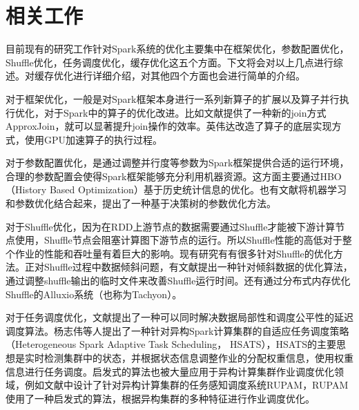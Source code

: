 \section{相关工作}
目前现有的研究工作针对Spark系统的优化主要集中在框架优化\cite{罗妮0基于机器学习的内存计算优化关键技术研究}\cite{廖湖声0Spark}，参数配置优化\cite{范天文2020基于内存计算框架}，Shuffle优化\cite{cheng2020ops}\cite{choi2015early}\cite{davidson2013optimizing}\cite{stone1971parallel}\cite{furukawa2001efficient}\cite{liu2017optimizing}\cite{张伟0Spark}\cite{lu2014accelerating}，任务调度优化\cite{杨志伟2016异构}\cite{李源0Spark}，缓存优\cite{kim2017sparkle}化\cite{卞琛2017并行计算框架}\cite{陈康2016Spark}这五个方面。下文将会对以上几点进行综述。对缓存优化进行详细介绍，对其他四个方面也会进行简单的介绍。

对于框架优化，一般是对Spark框架本身进行一系列新算子的扩展以及算子并行执行优化，对于Spark中的算子的优化改进。比如文献\cite{罗妮0基于机器学习的内存计算优化关键技术研究}提供了一种新的join方式ApproxJoin，就可以显著提升join操作的效率。英伟达改造了算子的底层实现方式，使用GPU加速算子的执行过程\cite{廖湖声0Spark}。

对于参数配置优化，是通过调整并行度等参数为Spark框架提供合适的运行环境，合理的参数配置会使得Spark框架能够充分利用机器资源。这方面主要通过HBO（History Based Optimization）基于历史统计信息的优\cite{范天文2020基于内存计算框架}化。也有文献将机器学习和参数优化结合起来，提出了一种基于决策树的参数优化方法\cite{罗妮0基于机器学习的内存计算优化关键技术研究}。

对于Shuffle优化，因为在RDD上游节点的数据需要通过Shuffle才能被下游计算节点使用，Shuffle节点会阻塞计算图下游节点的运行。所以Shuffle性能的高低对于整个作业的性能和吞吐量有着巨大的影响。现有研究有有很多针对Shuffle的优化方法。正对Shuffle过程中数据倾斜问题，有文献\cite{cheng2020ops}提出一种针对倾斜数据的优化算法，通过调整shuffle输出的临时文件来改善Shuffle运行时间。还有通过分布式内存优化Shuffle的Alluxio系统\cite{li2018alluxio}（也称为Tachyon\cite{li2014tachyon}）。

对于任务调度优化，文献\cite{zaharia2016architecture}提出了一种可以同时解决数据局部性和调度公平性的延迟调度算法。杨志伟\cite{杨志伟2016异构}等人提出了一种针对异构Spark计算集群的自适应任务调度策略（Heterogeneous Spark Adaptive Task Scheduling， HSATS），HSATS的主要思想是实时检测集群中的状态，并根据状态信息调整作业的分配权重信息，使用权重信息进行任务调度。启发式的算法也被大量应用于异构计算集群作业调度优化领域，例如文献中设计了针对异构计算集群的任务感知调度系统RUPAM\cite{刘莉2014异构集群下的任务调度算法研究}，RUPAM使用了一种启发式的算法，根据异构集群的多种特征进行作业调度优化。

